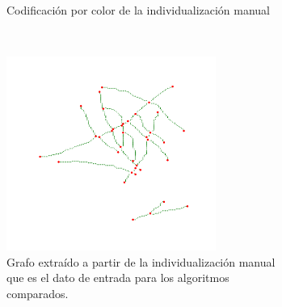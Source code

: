 \begin{figure}[h!]
\begin{subfigure}[t]{0.49\textwidth}
        \caption{Codificaci\'on por color de la individualizaci\'on manual}
        \label{fig:field3t0filtered1-indivManual}
    \end{subfigure}
    ~
    \begin{subfigure}[t]{0.49\textwidth}
        \centering
        \includegraphics[height=2.5in]{benchImages/field3-t0-2cellBcrop-filtered-graph-thick.png}
        \caption{Grafo extra\'ido a partir de la individualizaci\'on manual que es el dato de entrada para los algoritmos comparados.}
        \label{fig:field3t0filtered1-graph}
    \end{subfigure}
    \caption{}
    \label{fig:field3t0filtered1}
\end{figure}



